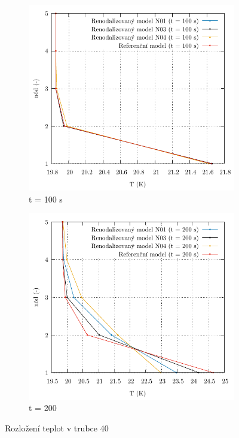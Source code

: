 \begin{figure}
	\centering
	\begin{subfigure}{0.5\textwidth}
		\centering
		\includegraphics[width=\textwidth, trim={0cm 0cm 0cm 0cm}, clip]{./05_TH_model_VR_1/grafy/temp_rozl/t_rozl_100.pdf}
		\caption{t = 100 s}
		\label{fig:temp_dist_srovnani_prilohy_100s}
	\end{subfigure}%
	\hfill
	\begin{subfigure}{0.5\textwidth}
		\centering
		\includegraphics[width=\textwidth, trim={0cm 0cm 0cm 0cm}, clip]{./05_TH_model_VR_1/grafy/temp_rozl/t_rozl_200.pdf}
		\caption{t = 200}
		\label{fig:temp_dist_srovnani_prilohy_200s}
	\end{subfigure}
	\caption{Rozložení teplot v trubce 40}
\end{figure}
